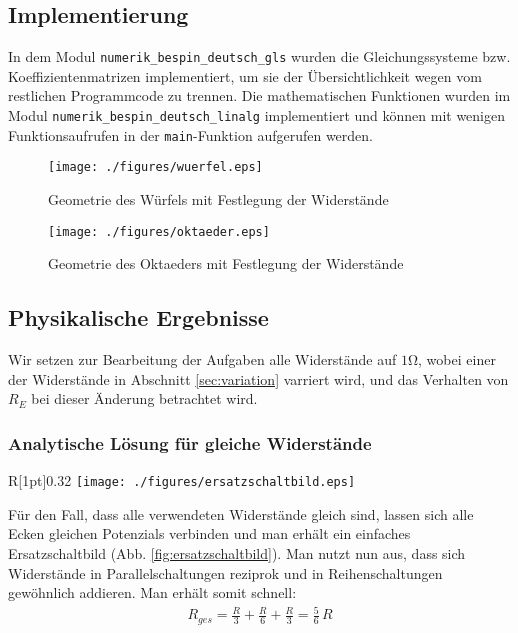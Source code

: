 \documentclass[10pt,a4paper]{article}
\begin{document}
\subsection{Implementierung}
In dem Modul \texttt{numerik\_bespin\_deutsch\_gls} wurden die Gleichungssysteme bzw. Koeffizientenmatrizen implementiert, um sie der Übersichtlichkeit wegen vom restlichen Programmcode zu trennen. Die mathematischen Funktionen wurden im Modul \texttt{numerik\_bespin\_deutsch\_linalg} implementiert und können mit wenigen Funktionsaufrufen in der \texttt{main}-Funktion aufgerufen werden.

\begin{figure}[htbp!]
\centering
\texttt{[image: ./figures/wuerfel.eps]}
\caption{Geometrie des Würfels mit Festlegung der Widerstände}
\label{fig:geometrie_wuerfel}
\end{figure}

\begin{figure}[htbp!]
\centering
\texttt{[image: ./figures/oktaeder.eps]}
\caption{Geometrie des Oktaeders mit Festlegung der Widerstände}
\label{fig:geometrie_oktaeder}
\end{figure}

\subsection{Physikalische Ergebnisse}

Wir setzen zur Bearbeitung der Aufgaben alle Widerstände auf $1$\si{\ohm}, wobei einer der Widerstände in Abschnitt \ref{sec:variation} varriert wird, und das Verhalten von $R_E$ bei dieser Änderung betrachtet wird.

\subsubsection{Analytische Lösung für gleiche Widerstände}
\label{auswertung}
\begin{wrapfigure}[12]{R}[1pt]{0.32\textwidth}
\centering
\texttt{[image: ./figures/ersatzschaltbild.eps]}
\caption{Schaltbild für gleiche Widerstände $R$}
\label{fig:ersatzschaltbild}
\end{wrapfigure}
Für den Fall, dass alle verwendeten Widerstände gleich sind, lassen sich alle Ecken gleichen Potenzials verbinden und man erhält ein einfaches Ersatzschaltbild (Abb. \ref{fig:ersatzschaltbild}). Man nutzt nun aus, dass sich Widerstände in Parallelschaltungen reziprok und in Reihenschaltungen gewöhnlich addieren. Man erhält somit schnell:
\begin{align}
R_{ges}=\frac{R}{3}+\frac{R}{6}+\frac{R}{3}=\frac{5}{6}\,R
\end{align}
\end{document}
